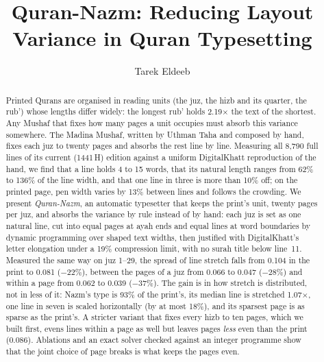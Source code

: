 \documentclass[sigconf,nonacm]{acmart}
\newcommand{\x}{\ensuremath{\times}}
\newcommand{\paperversion}{v0.4.2}%
\begin{document}
\title{Quran-Nazm: Reducing Layout Variance in Quran Typesetting}
\titlenote{Paper version \paperversion.}

\author{Tarek Eldeeb}

\begin{abstract}
Printed Qurans are organised in reading units (the juz, the hizb and its quarter, the rub') whose lengths differ widely: the longest rub' holds 2.19\x{} the text of the shortest. Any Mushaf that fixes how many pages a unit occupies must absorb this variance somewhere. The Madina Mushaf, written by Uthman Taha and composed by hand, fixes each juz to twenty pages and absorbs the rest line by line. Measuring all 8{,}790 full lines of its current (1441\,H) edition against a uniform DigitalKhatt reproduction of the hand, we find that a line holds 4 to 15 words, that its natural length ranges from 62\% to 136\% of the line width, and that one line in three is more than 10\% off; on the printed page, pen width varies by 13\% between lines and follows the crowding. We present \emph{Quran-Nazm}, an automatic typesetter that keeps the print's unit, twenty pages per juz, and absorbs the variance by rule instead of by hand: each juz is set as one natural line, cut into equal pages at ayah ends and equal lines at word boundaries by dynamic programming over shaped text widths, then justified with DigitalKhatt's letter elongation under a 19\% compression limit, with no surah title below line~11. Measured the same way on juz 1--29, the spread of line stretch falls from 0.104 in the print to 0.081 ($-22\%$), between the pages of a juz from 0.066 to 0.047 ($-28\%$) and within a page from 0.062 to 0.039 ($-37\%$). The gain is in how stretch is distributed, not in less of it: Nazm's type is 93\% of the print's, its median line is stretched 1.07\x, one line in seven is scaled horizontally (by at most 18\%), and its sparsest page is as sparse as the print's. A stricter variant that fixes every hizb to ten pages, which we built first, evens lines within a page as well but leaves pages \emph{less} even than the print (0.086). Ablations and an exact solver checked against an integer programme show that the joint choice of page breaks is what keeps the pages even.
\end{abstract}

\end{document}
